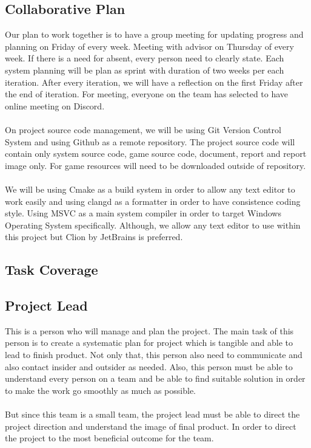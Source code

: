\subsection{Collaborative Plan}
\label{subsec:collaborative-plan}
Our plan to work together is to have a group meeting for updating progress and planning on Friday of every week.
Meeting with advisor on Thursday of every week.
If there is a need for absent, every person need to clearly state.
Each system planning will be plan as sprint with duration of two weeks per each iteration.
After every iteration, we will have a reflection on the first Friday after the end of iteration.
For meeting, everyone on the team has selected to have online meeting on Discord.
\\\\
On project source code management, we will be using Git Version Control System and using Github as
a remote repository.
The project source code will contain only system source code, game source code, document, report and report image only.
For game resources will need to be downloaded outside of repository.
\\\\
We will be using Cmake as a build system in order to allow any text editor to work easily and using clangd as a formatter
in order to have consistence coding style.
Using MSVC as a main system compiler in order to target Windows Operating System specifically.
Although, we allow any text editor to use within this project but Clion by JetBrains is preferred.

\subsection{Task Coverage}
\label{subsec:task-coverage}

\subsection*{Project Lead}
This is a person who will manage and plan the project.
The main task of this person is to create a systematic plan for project which is tangible and able to lead to finish product.
Not only that, this person also need to communicate and also contact insider and outsider as needed.
Also, this person must be able to understand every person on a team and be able to find suitable solution in order to make
the work go smoothly as much as possible.
\\\\
But since this team is a small team, the project lead must be able to direct the project direction and understand the image
of final product.
In order to direct the project to the most beneficial outcome for the team.

